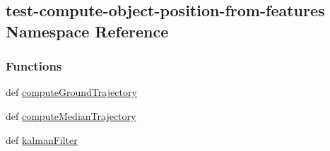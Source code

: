 \hypertarget{namespacetest-compute-object-position-from-features}{\subsection{test-\/compute-\/object-\/position-\/from-\/features Namespace Reference}
\label{namespacetest-compute-object-position-from-features}
}
\subsubsection*{Functions}
\begin{DoxyCompactItemize}
\item 
def \hyperlink{namespacetest-compute-object-position-from-features_affcda8bdebff94b2b41a08cb5d5d5477}{compute\-Ground\-Trajectory}
\item 
def \hyperlink{namespacetest-compute-object-position-from-features_a3eb8aee8e1412f0fe7ea92f63145a4af}{compute\-Median\-Trajectory}
\item 
def \hyperlink{namespacetest-compute-object-position-from-features_a8696675368f9b4c49211e5e727581968}{kalman\-Filter}
\end{DoxyCompactItemize}
